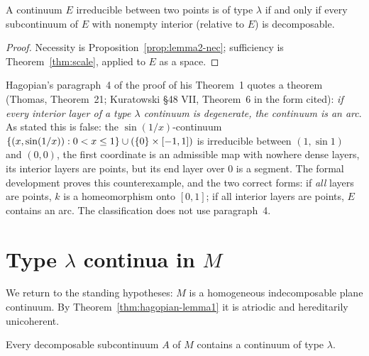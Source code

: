 \begin{theorem}\label{thm:lemma2}
A continuum $E$ irreducible between two points is of type $\lambda$ if and only if every subcontinuum of $E$ with
nonempty interior (relative to $E$) is decomposable.
\end{theorem}

\begin{proof}
Necessity is Proposition~\ref{prop:lemma2-nec}; sufficiency is Theorem~\ref{thm:scale}, applied to $E$ as a
space.
\end{proof}


\begin{remark}\label{rem:thomas21}
Hagopian's paragraph~4 of the proof of his Theorem~1 quotes a theorem (Thomas, Theorem~21; Kuratowski
\S48 VII, Theorem~6 in the form cited): \emph{if every interior layer of a type $\lambda$ continuum is degenerate,
the continuum is an arc}. As stated this is false: the $\sin(1/x)$-continuum
$\left\{ (x,\sin(1/x)):0<x\le1 \right\}\cup(\left\{ 0 \right\}\times[-1,1])$ is irreducible between $(1,\sin1)$ and $(0,0)$, the first
coordinate is an admissible map with nowhere dense layers, its interior layers are points, but its end layer
over $0$ is a segment. The formal development proves this counterexample, and the two correct forms: if
\emph{all} layers are points, $k$ is a homeomorphism onto $[0,1]$; if all interior layers are points, $E$
contains an arc. The classification does not use paragraph~4.
\end{remark}


\section{Type \texorpdfstring{$\lambda$}{lambda} continua in \texorpdfstring{$M$}{M}}

We return to the standing hypotheses: $M$ is a homogeneous indecomposable plane continuum. By
Theorem~\ref{thm:hagopian-lemma1} it is atriodic and hereditarily unicoherent.

\begin{theorem}\label{thm:exists-lambda}
Every decomposable subcontinuum $A$ of $M$ contains a continuum of type $\lambda$.
\end{theorem}


